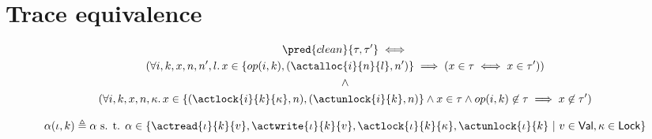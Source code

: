 \section{Trace equivalence}

\begin{gather*}
	\pred{clean}{\tau, \tau'} \iff \\
	(\forall i, k, x, n, n', l \ldotp x \in \{op(i, k), (\actalloc{i}{n}{l}, n')\} \implies (x \in \tau \iff x \in \tau')) \\
	\land \\
	(\forall i, k, x, n, \kappa \ldotp x \in \{ (\actlock{i}{k}{\kappa}, n), (\actunlock{i}{k}, n) \} \land x \in \tau \land op(i, k) \not\in \tau \implies x \not\in \tau')
\end{gather*}

\[
	\alpha(\iota, k) \triangleq \alpha \text{ s. t. }
	\alpha \in 
		\{
			\actread{\iota}{k}{v},
			\actwrite{\iota}{k}{v},
			\actlock{\iota}{k}{\kappa},
			\actunlock{\iota}{k}\
			|\ v \in \mathsf{Val}, \kappa \in \mathsf{Lock}
		\}
\]

